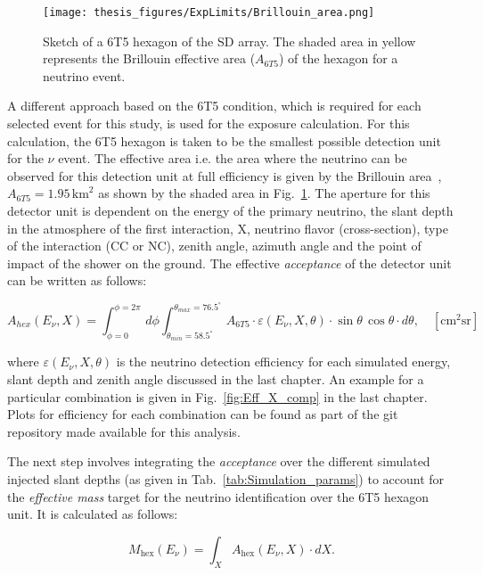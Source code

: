 \begin{figure}[t!]
  \centering
  \texttt{[image: thesis\_figures/ExpLimits/Brillouin\_area.png]}
  \caption{Sketch of a 6T5 hexagon of the SD array. The shaded area in yellow represents the Brillouin effective area ($A_{6T5}$) of the hexagon for a neutrino event.}
  \label{fig:Brillouin_area}
\end{figure}

A different approach based on the 6T5 condition, which is required for each selected event for this study, is used for the exposure calculation. For this calculation, the 6T5 hexagon is taken to be the smallest possible detection unit for the $\nu$ event. The effective area i.e. the area where the neutrino can be observed for this detection unit at full efficiency is given by the Brillouin area~\cite{PierreAuger:2010zof}, $A_{6T5} = 1.95\,\mathrm{km}^2$ as shown by the shaded area in Fig.~\ref{fig:Brillouin_area}. The aperture for this detector unit is dependent on the energy of the primary neutrino, the slant depth in the atmosphere of the first interaction, X, neutrino flavor (cross-section), type of the interaction (CC or NC), zenith angle, azimuth angle and the point of impact of the shower on the ground. The effective \textit{acceptance} of the detector unit can be written as follows:

\begin{equation}
  \label{eq:nu_accep}
  A_{hex}(E_{\nu}, X)  = \int^{\phi = 2\pi}_{\phi = 0} \,d\phi \int_{\theta_{min} = 58.5^{\circ}}^{\theta_{max}= 76.5^{\circ}}  \, A_{6T5} \cdot \varepsilon(E_{\nu}, X, \theta) \cdot \sin \theta \, \cos \theta \cdot d\theta, \quad   \mathrm{[cm^2 sr]}
\end{equation}

where $\varepsilon(E_{\nu}, X, \theta)$ is the neutrino detection efficiency for each simulated energy, slant depth and zenith angle discussed in the last chapter. An example for a particular combination is given in Fig.~\ref{fig:Eff_X_comp} in the last chapter. Plots for efficiency for each combination can be found as part of the git repository made available for this analysis.

The next step involves integrating the \textit{acceptance} over the different simulated injected slant depths (as given in Tab.~\ref{tab:Simulation_params}) to account for the \textit{effective mass} target for the neutrino identification over the 6T5 hexagon unit. It is calculated as follows: 

\begin{equation}
  \label{eq:nu_eff_mass}
  M_{\text{hex}}(E_{\nu}) = \int_X A_{\text{hex}}(E_{\nu}, X) \cdot dX.
\end{equation}

